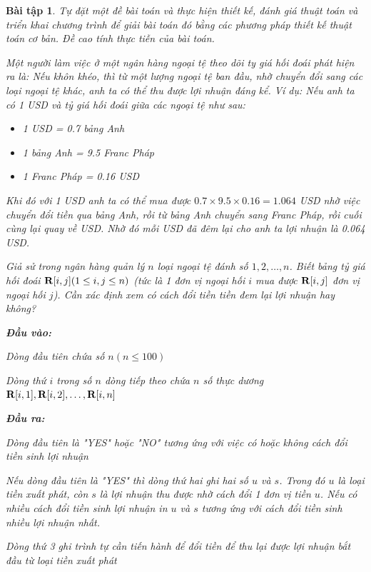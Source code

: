 \documentclass[14pt, a4paper]{article}
\theoremstyle{sltheorem}
\newtheorem{baitap}{Bài tập}
\theoremstyle{soltheorem}
\begin{document}
    \begin{baitap}
        Tự đặt một đề bài toán và thực hiện thiết kế, đánh giá thuật toán và triển khai
        chương trình để giải bài toán đó bằng các phương pháp thiết kế thuật toán cơ bản.
        Đề cao tính thực tiễn của bài toán.

        Một người làm việc ở một ngân hàng ngoại tệ theo dõi ty giá hối đoái phát hiện ra là: Nếu khôn
        khéo, thì từ một lượng ngoại tệ ban đầu, nhờ chuyển đổi sang các loại ngoại tệ khác, anh ta có thể
        thu được lợi nhuận đáng kể.
        Ví dụ: Nếu anh ta có 1 USD và tỷ giá hối đoái giữa các ngoại tệ như sau:
        \begin{itemize}
            \item 1 USD = 0.7 bảng Anh
            \item 1 bảng Anh = 9.5 Franc Pháp 
            \item 1 Franc Pháp = 0.16 USD
        \end{itemize}
        Khi đó với 1 USD anh ta có thể mua được $0.7 \times 9.5 \times 0.16 = 1.064$ USD nhờ việc chuyển đổi tiền qua bảng Anh,
        rồi từ bảng Anh chuyển sang Franc Pháp, rồi cuối cùng lại quay về USD. Nhờ đó mỗi USD đã đêm lại cho anh ta lợi nhuận là 0.064 USD.

        Giả sử trong ngân hàng quản lý $n$ loại ngoại tệ đánh số $1, 2, \dots, n $.
        Biết bảng tỷ giá hối đoái $\bold{R} \lbrack i, j  \rbrack (1 \leq i, j \leq n)$ (tức là 1 đơn vị ngoại hối $i$ mua được $\bold{R} \lbrack i, j \rbrack$ đơn vị ngoại hối $j$).
        Cần xác định xem có cách đổi tiền tiền đem lại lợi nhuận hay không?

        \textbf{Đầu vào:}

        Dòng đầu tiên chứa số $n (n \leq 100)$

        Dòng thứ $i$ trong số $n$ dòng tiếp theo chứa $n$ số thực dương $\bold{R} \lbrack i, 1 \rbrack, \bold{R} \lbrack i, 2 \rbrack, \dots, \bold{R} \lbrack i, n \rbrack$

        \textbf{Đầu ra:}

        Dòng đầu tiên là "YES" hoặc "NO" tương ứng với việc có hoặc không cách đổi tiền sinh lợi nhuận

        Nếu dòng đầu tiên là "YES" thì dòng thứ hai ghi hai số $u$ và $s$. 
        Trong đó $u$ là loại tiền xuất phát, còn $s$ là lợi nhuận thu được nhờ cách đổi 1 đơn vị tiền $u$.
        Nếu có nhiều cách đổi tiền sinh lợi nhuận in $u$ và $s$ tương ứng với cách đổi tiền sinh nhiều lợi nhuận nhất.

        Dòng thứ 3 ghi trình tự cần tiến hành để đổi tiền để thu lại được lợi nhuận bắt đầu từ loại tiền xuất phát
    \end{baitap}
\end{document}
